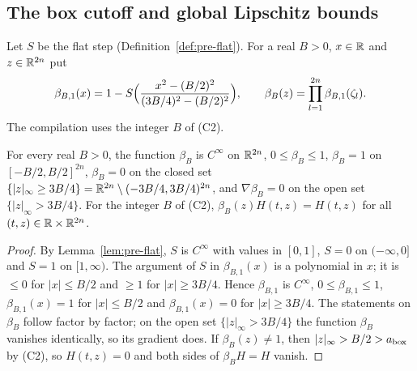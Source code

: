 \subsection{The box cutoff and global Lipschitz bounds}\label{sec:cpl-box}

\begin{definition}\label{def:cpl-box}
Let $S$ be the flat step (Definition~\ref{def:pre-flat}). For a real $B>0$, $x\in\mathbb{R}$ and $z\in\mathbb{R}^{2n}$ put
\[
 \beta_{B,1}(x)=1-S\Bigl(\frac{x^2-(B/2)^2}{(3B/4)^2-(B/2)^2}\Bigr),\qquad
 \beta_B(z)=\prod_{l=1}^{2n}\beta_{B,1}(\zeta_l).
\]
The compilation uses the integer $B$ of (C2).
\end{definition}

\begin{lemma}\label{lem:cpl-box}
For every real $B>0$, the function $\beta_B$ is $C^\infty$ on $\mathbb{R}^{2n}$, $0\le\beta_B\le1$, $\beta_B=1$ on
$[-B/2,B/2]^{2n}$, $\beta_B=0$ on the closed set $\{|z|_\infty\ge3B/4\}=\mathbb{R}^{2n}\setminus(-3B/4,3B/4)^{2n}$, and
$\nabla\beta_B=0$ on the open set $\{|z|_\infty>3B/4\}$. For the integer $B$ of (C2),
$\beta_B(z)H(t,z)=H(t,z)$ for all $(t,z)\in\mathbb{R}\times\mathbb{R}^{2n}$.
\end{lemma}

\begin{proof}
By Lemma~\ref{lem:pre-flat}, $S$ is $C^\infty$ with values in $[0,1]$, $S=0$ on $(-\infty,0]$ and $S=1$ on
$[1,\infty)$. The argument of $S$ in $\beta_{B,1}(x)$ is a polynomial in $x$; it is $\le0$ for $|x|\le B/2$ and
$\ge1$ for $|x|\ge3B/4$. Hence $\beta_{B,1}$ is $C^\infty$, $0\le\beta_{B,1}\le1$, $\beta_{B,1}(x)=1$ for $|x|\le B/2$
and $\beta_{B,1}(x)=0$ for $|x|\ge3B/4$. The statements on $\beta_B$ follow factor by factor; on the open set
$\{|z|_\infty>3B/4\}$ the function $\beta_B$ vanishes identically, so its gradient does. If $\beta_B(z)\ne1$, then
$|z|_\infty>B/2>a_{\rm box}$ by (C2), so $H(t,z)=0$ and both sides of $\beta_BH=H$ vanish.
\end{proof}

